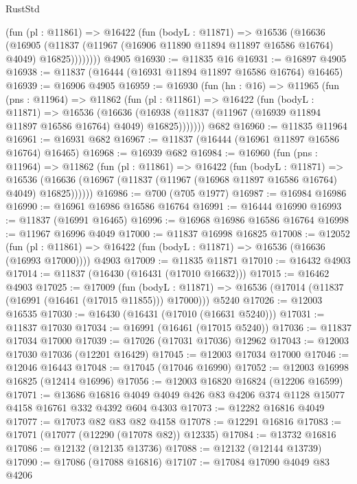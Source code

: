 \begin{lexlean}{RustStd}
\begin{coremodule}
{\begin{coremodule}
{{{{{{{{{{{{{{{{{{{{{{{{{{{{{{{{{{{{{{{{{{{{{{{{{{          (fun (pl : @11861) =>
          @16422
            (fun (bodyL : @11871) =>
            @16536
              (@16636
                (@16905
                  (@11837 (@11967 (@16906 @11890 @11894 @11897 @16586 @16764) @4049) @16825))))))))
    @4905
@16930 := @11835 @16
@16931 := @16897 @4905
@16938 := @11837 (@16444 (@16931 @11894 @11897 @16586 @16764) @16465)
@16939 := @16906 @4905
@16959 := @16930
    (fun (hn : @16) =>
    @11965
      (fun (pns : @11964) =>
      @11862
        (fun (pl : @11861) =>
        @16422
          (fun (bodyL : @11871) =>
          @16536
            (@16636
              (@16938 (@11837 (@11967 (@16939 @11894 @11897 @16586 @16764) @4049) @16825)))))))
    @682
@16960 := @11835 @11964
@16961 := @16931 @682
@16967 := @11837 (@16444 (@16961 @11897 @16586 @16764) @16465)
@16968 := @16939 @682
@16984 := @16960
    (fun (pns : @11964) =>
    @11862
      (fun (pl : @11861) =>
      @16422
        (fun (bodyL : @11871) =>
        @16536 (@16636 (@16967 (@11837 (@11967 (@16968 @11897 @16586 @16764) @4049) @16825))))))
@16986 := @700 (@705 @1977)
@16987 := @16984 @16986
@16990 := @16961 @16986 @16586 @16764
@16991 := @16444 @16990
@16993 := @11837 (@16991 @16465)
@16996 := @16968 @16986 @16586 @16764
@16998 := @11967 @16996 @4049
@17000 := @11837 @16998 @16825
@17008 := @12052
    (fun (pl : @11861) => @16422 (fun (bodyL : @11871) => @16536 (@16636 (@16993 @17000))))
    @4903
@17009 := @11835 @11871
@17010 := @16432 @4903
@17014 := @11837 (@16430 (@16431 (@17010 @16632)))
@17015 := @16462 @4903
@17025 := @17009
    (fun (bodyL : @11871) => @16536 (@17014 (@11837 (@16991 (@16461 (@17015 @11855))) @17000)))
    @5240
@17026 := @12003 @16535
@17030 := @16430 (@16431 (@17010 (@16631 @5240)))
@17031 := @11837 @17030
@17034 := @16991 (@16461 (@17015 @5240))
@17036 := @11837 @17034 @17000
@17039 := @17026 (@17031 @17036) @12962
@17043 := @12003 @17030 @17036 (@12201 @16429)
@17045 := @12003 @17034 @17000
@17046 := @12046 @16443
@17048 := @17045 (@17046 @16990)
@17052 := @12003 @16998 @16825 (@12414 @16996)
@17056 := @12003 @16820 @16824 (@12206 @16599)
@17071 := @13686
    @16816
    @4049
    @4049
    @426
    @83
    @4206
    @374
    @1128
    @15077
    @4158
    @16761
    @332
    @4392
    @604
    @4303
@17073 := @12282 @16816 @4049
@17077 := @17073 @82 @83 @82 @4158
@17078 := @12291 @16816
@17083 := @17071 (@17077 (@12290 (@17078 @82)) @12335)
@17084 := @13732 @16816
@17086 := @12132 (@12135 @13736)
@17088 := @12132 (@12144 @13739)
@17090 := @17086 (@17088 @16816)
@17107 := @17084
    @17090
    @4049
    @83
    @4206
}}}}}}}}}}}}}}}}}}}}}}}}}}}}}}}}}}}}}}}}}}}}}}}}}}
\end{coremodule}}
\end{coremodule}
\end{lexlean}
